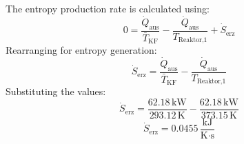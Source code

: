 The entropy production rate is calculated using:  
\[
0 = \frac{\dot{Q}_{\text{aus}}}{\bar{T}_{\text{KF}}} - \frac{\dot{Q}_{\text{aus}}}{T_{\text{Reaktor,1}}} + \dot{S}_{\text{erz}}
\]  
Rearranging for entropy generation:  
\[
\dot{S}_{\text{erz}} = \frac{\dot{Q}_{\text{aus}}}{\bar{T}_{\text{KF}}} - \frac{\dot{Q}_{\text{aus}}}{T_{\text{Reaktor,1}}}
\]  
Substituting the values:  
\[
\dot{S}_{\text{erz}} = \frac{62.18 \, \text{kW}}{293.12 \, \text{K}} - \frac{62.18 \, \text{kW}}{373.15 \, \text{K}}
\]  
\[
\dot{S}_{\text{erz}} = 0.0455 \, \frac{\text{kJ}}{\text{K·s}}
\]